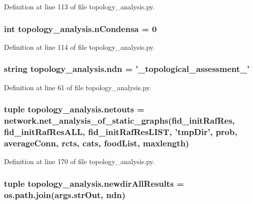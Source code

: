 Definition at line 113 of file topology\-\_\-analysis.\-py.

\hypertarget{a00157_a38aa665f11207bbd8cd2da4c382d4aca}{
\subsubsection[{n\-Condensa}]{\setlength{\rightskip}{0pt plus 5cm}int topology\-\_\-analysis.\-n\-Condensa = 0}}\label{a00157_a38aa665f11207bbd8cd2da4c382d4aca}


Definition at line 114 of file topology\-\_\-analysis.\-py.

\hypertarget{a00157_aa6d4ad4089dc05372dcdfe03c969b8b4}{
\subsubsection[{ndn}]{\setlength{\rightskip}{0pt plus 5cm}string topology\-\_\-analysis.\-ndn = '\-\_\-topological\-\_\-assessment\-\_\-'}}\label{a00157_aa6d4ad4089dc05372dcdfe03c969b8b4}


Definition at line 61 of file topology\-\_\-analysis.\-py.

\hypertarget{a00157_af42f57da8ba80463f419efaf0f6f2c33}{
\subsubsection[{netouts}]{\setlength{\rightskip}{0pt plus 5cm}tuple topology\-\_\-analysis.\-netouts = network.\-net\-\_\-analysis\-\_\-of\-\_\-static\-\_\-graphs({\bf fid\-\_\-init\-Raf\-Res}, {\bf fid\-\_\-init\-Raf\-Res\-A\-L\-L}, {\bf fid\-\_\-init\-Raf\-Res\-L\-I\-S\-T}, 'tmp\-Dir', {\bf prob}, {\bf average\-Conn}, rcts, cats, {\bf food\-List}, maxlength)}}\label{a00157_af42f57da8ba80463f419efaf0f6f2c33}


Definition at line 170 of file topology\-\_\-analysis.\-py.

\hypertarget{a00157_a8e1c34cb190151a28fd81e19d6252253}{
\subsubsection[{newdir\-All\-Results}]{\setlength{\rightskip}{0pt plus 5cm}tuple topology\-\_\-analysis.\-newdir\-All\-Results = os.\-path.\-join(args.\-str\-Out, {\bf ndn})}}\label{a00157_a8e1c34cb190151a28fd81e19d6252253}


